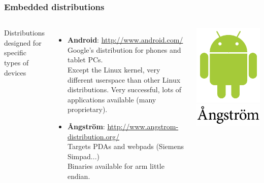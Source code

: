 \begin{frame}
  \frametitle{Embedded distributions}
  \small
  \begin{columns}
    Distributions designed for specific types of devices
    \begin{itemize}
    \item {\bf Android}: \url{http://www.android.com/}\\
      Google's distribution for phones and tablet PCs.\\
      Except the Linux kernel, very different userspace
      than other Linux distributions. Very successful,
      lots of applications available (many proprietary).
    \item {\bf Ångström}: \url{http://www.angstrom-distribution.org/}\\
      Targets PDAs and webpads (Siemens Simpad...)\\
      Binaries available for arm little endian.
    \end{itemize}
    \includegraphics[width=\textwidth]{slides/sysdev-embedded-linux/android.png}\\
    \includegraphics[width=\textwidth]{slides/sysdev-embedded-linux/angstrom.png}\\
  \end{columns}
\end{frame}

